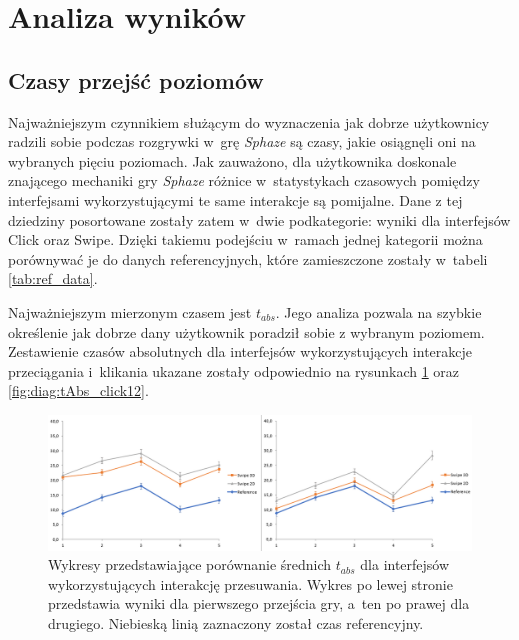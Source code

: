 \documentclass[a4paper,12pt,numbers=noenddot]{report}
\begin{document}
\section{Analiza wyników}
\subsection{Czasy przejść poziomów}
Najważniejszym czynnikiem służącym do wyznaczenia jak dobrze użytkownicy radzili sobie podczas rozgrywki w~grę \textit{Sphaze} są czasy, jakie osiągnęli oni na wybranych pięciu poziomach. Jak zauważono, dla użytkownika doskonale znającego mechaniki gry \textit{Sphaze} różnice w~statystykach czasowych pomiędzy interfejsami wykorzystującymi te same interakcje są pomijalne. Dane z tej dziedziny posortowane zostały zatem w~dwie podkategorie: wyniki dla interfejsów Click oraz Swipe. Dzięki takiemu podejściu w~ramach jednej kategorii można porównywać je do danych referencyjnych, które zamieszczone zostały w~tabeli \ref{tab:ref_data}. 

Najważniejszym mierzonym czasem jest $t_{abs}$. Jego analiza pozwala na szybkie określenie jak dobrze dany użytkownik poradził sobie z wybranym poziomem. Zestawienie czasów absolutnych dla interfejsów wykorzystujących interakcje przeciągania i~klikania ukazane zostały odpowiednio na rysunkach \ref{fig:diag:tAbs_swipe12} oraz \ref{fig:diag:tAbs_click12}.

\begin{figure}[h!]
	\centering
  	\includegraphics[width=\linewidth]{diag/tAbs_swipe12.png}
	\caption{Wykresy przedstawiające porównanie średnich $t_{abs}$ dla interfejsów wykorzystujących interakcję przesuwania. Wykres po lewej stronie przedstawia wyniki dla pierwszego przejścia gry, a~ten po prawej dla drugiego. Niebieską linią zaznaczony został czas referencyjny.}
	\label{fig:diag:tAbs_swipe12}
\end{figure}
\end{document}
